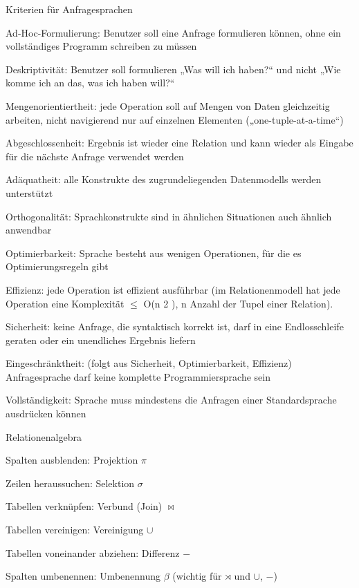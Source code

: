 \documentclass[a4paper]{article}
\begin{document}
\begin{multicols}{3}
    Kriterien für Anfragesprachen
    \begin{itemize*}
        \item Ad-Hoc-Formulierung: Benutzer soll eine Anfrage formulieren können, ohne ein vollständiges Programm schreiben zu müssen
        \item Deskriptivität: Benutzer soll formulieren „Was will ich haben?“ und nicht „Wie komme ich an das, was ich haben will?“
        \item Mengenorientiertheit: jede Operation soll auf Mengen von Daten gleichzeitig arbeiten, nicht navigierend nur auf einzelnen Elementen („one-tuple-at-a-time“)
        \item Abgeschlossenheit: Ergebnis ist wieder eine Relation und kann wieder als Eingabe für die nächste Anfrage verwendet werden
        \item Adäquatheit: alle Konstrukte des zugrundeliegenden Datenmodells werden unterstützt
        \item Orthogonalität: Sprachkonstrukte sind in ähnlichen Situationen auch ähnlich anwendbar
        \item Optimierbarkeit: Sprache besteht aus wenigen Operationen, für die es Optimierungsregeln gibt
        \item Effizienz: jede Operation ist effizient ausführbar (im Relationenmodell hat jede Operation eine Komplexität $\leq$ O(n 2 ), n Anzahl der Tupel einer Relation).
        \item Sicherheit: keine Anfrage, die syntaktisch korrekt ist, darf in eine Endlosschleife geraten oder ein unendliches Ergebnis liefern
        \item Eingeschränktheit: (folgt aus Sicherheit, Optimierbarkeit, Effizienz) Anfragesprache darf keine komplette Programmiersprache sein
        \item Vollständigkeit: Sprache muss mindestens die Anfragen einer Standardsprache ausdrücken können
    \end{itemize*}

    Relationenalgebra
    \begin{itemize*}
        \item Spalten ausblenden: Projektion $\pi$
        \item Zeilen heraussuchen: Selektion $\sigma$
        \item Tabellen verknüpfen: Verbund (Join) $\bowtie$
        \item Tabellen vereinigen: Vereinigung $\cup$
        \item Tabellen voneinander abziehen: Differenz $-$
        \item Spalten umbenennen: Umbenennung $\beta$ (wichtig für $\rtimes$ und $\cup$, $-$)
    \end{itemize*}


\end{multicols}
\end{document}
